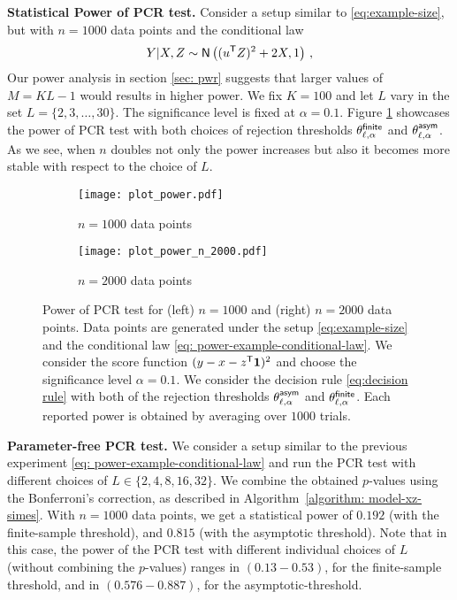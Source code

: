 \documentclass[11pt]{article}
\def\normal{\mathsf{N}}
\begin{document}
	\noindent \textbf{Statistical Power of PCR test.} Consider a setup similar to \eqref{eq:example-size}, but with $n=1000$ data points and the conditional law 
	\begin{equation}\label{eq: power-example-conditional-law}
		Y|X,Z \sim \normal  \left((u^\sT Z)^2+2 X,1 \right)\,,
	\end{equation}
	Our power analysis in section \ref{sec: pwr} suggests that larger values of $M=KL-1$ would results in higher power. We fix $K=100$ and let $L$ vary in the set $L=\{2,3,\dotsc,30\}$. The significance level is fixed at $\alpha=0.1$. Figure  \ref{fig: powers} showcases the power of PCR test with both choices of rejection thresholds  $\theta^{\mathsf{finite}}_{\ell,\alpha}$ and $\theta^{\mathsf{asym}}_{\ell,\alpha}$. As we see, when $n$ doubles not only the power increases but also it becomes more stable with respect to the choice of $L$.  
\begin{figure}[]
\centering
\begin{subfigure}{0.5\textwidth}
		\centering
		\texttt{[image: plot\_power.pdf]}
		\caption{$n=1000$ data points}
	\end{subfigure}%
\begin{subfigure}{0.5\textwidth}
			\texttt{[image: plot\_power\_n\_2000.pdf]}
	\caption{$n=2000$ data points}
\end{subfigure}
\caption{ Power of PCR test for (left) $n=1000$  and (right) $n=2000$ data points. Data points are generated under the setup \eqref{eq:example-size} and the conditional law \eqref{eq: power-example-conditional-law}. We consider the score function $(y-x-z^{\sf T}\mathbf{1})^2$ and choose the significance level $\alpha=0.1$. We consider the decision rule \eqref{eq:decision rule} with  both of the rejection thresholds $\theta^{\mathsf{asym}}_{\ell,\alpha}$ and $\theta^{\mathsf{finite}}_{\ell,\alpha}$. Each reported power is obtained by averaging over $1000$ trials.}\label{fig: powers}
\end{figure}
	\bigskip
	
	\noindent
	\textbf{Parameter-free PCR test.}
	We consider a setup similar to the previous experiment \eqref{eq: power-example-conditional-law} and run the PCR test with different choices of $L\in\{2,4,8,16,32\}$. 
	We combine the obtained $p$-values using the Bonferroni's correction, as described in Algorithm~\ref{algorithm: model-xz-simes}.  With $n=1000$ data points, we get a statistical power of $0.192$ (with the finite-sample threshold), and $0.815$ (with the asymptotic threshold). Note that in this case, the power of the PCR test with different individual choices of $L$ (without combining the $p$-values) ranges in $(0.13-0.53)$, for the finite-sample threshold, and in $(0.576-0.887)$, for the asymptotic-threshold. 
	
\end{document}
